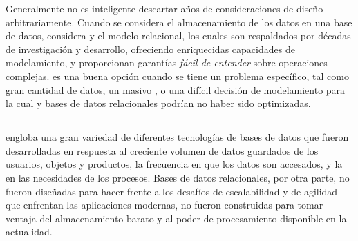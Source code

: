 Generalmente no es inteligente descartar años de consideraciones de diseño arbitrariamente. Cuando se considera el almacenamiento de los datos en una base de datos, considera \sqlNAME y el modelo relacional, los cuales son respaldados por décadas  de investigación y desarrollo, ofreciendo enriquecidas capacidades de modelamiento, y proporcionan garantías \textit{fácil-de-entender} sobre operaciones complejas. \nosqlNAME es una buena opción cuando se tiene un problema específico, tal como gran cantidad de datos, un masivo \workload, o una difícil decisión de modelamiento para la cual \sqlNAME y bases de datos relacionales podrían no haber sido optimizadas.

\subsection{\nosqlNAME}

\nosqlNAME engloba una gran variedad de diferentes tecnologías de bases de datos que fueron desarrolladas en respuesta al creciente volumen de datos guardados de los usuarios, objetos y productos, la frecuencia en que los datos son accesados, y la \performanceQA en las necesidades de los procesos. Bases de datos relacionales, por otra parte, no fueron diseñadas para hacer frente a los desafíos de escalabilidad y de agilidad que enfrentan las aplicaciones modernas, no fueron construidas para tomar ventaja del almacenamiento barato y al poder de procesamiento disponible en la actualidad.

